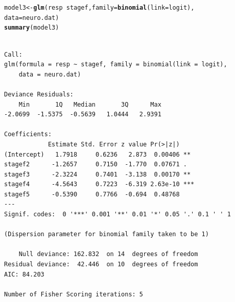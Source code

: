 \documentclass[oneside]{book}\usepackage[]{graphicx}\usepackage[svgnames]{xcolor}
\makeatletter
\newcommand{\hlopt}[1]{\textcolor[rgb]{0,0,0}{#1}}%
\newcommand{\hlstd}[1]{\textcolor[rgb]{0.345,0.345,0.345}{#1}}%
\newcommand{\hlkwb}[1]{\textcolor[rgb]{0.69,0.353,0.396}{#1}}%
\newcommand{\hlkwc}[1]{\textcolor[rgb]{0.333,0.667,0.333}{#1}}%
\newcommand{\hlkwd}[1]{\textcolor[rgb]{0.737,0.353,0.396}{\textbf{#1}}}%
\newenvironment{kframe}{%
 \def\at@end@of@kframe{}%
 \ifinner\ifhmode%
  \def\at@end@of@kframe{\end{minipage}}%
  \begin{minipage}{\columnwidth}%
 \fi\fi%
 \def\FrameCommand##1{\hskip\@totalleftmargin \hskip-\fboxsep
 \colorbox{shadecolor}{##1}\hskip-\fboxsep
     \hskip-\linewidth \hskip-\@totalleftmargin \hskip\columnwidth}%
 \MakeFramed {\advance\hsize-\width
   \@totalleftmargin\z@ \linewidth\hsize
   \@setminipage}}%
 {\par\unskip\endMakeFramed%
 \at@end@of@kframe}
\newenvironment{knitrout}{}{} %
\makeatother
\begin{document}
\begin{knitrout}
\color{fgcolor}\begin{kframe}
\begin{alltt}
\hlstd{model3} \hlkwb{<-} \hlkwd{glm}\hlstd{(resp} \hlopt{~} \hlstd{stagef,} \hlkwc{family} \hlstd{=} \hlkwd{binomial}\hlstd{(}\hlkwc{link} \hlstd{= logit),}
  \hlkwc{data} \hlstd{= neuro.dat)}
\hlkwd{summary}\hlstd{(model3)}
\end{alltt}
\begin{verbatim}

Call:
glm(formula = resp ~ stagef, family = binomial(link = logit), 
    data = neuro.dat)

Deviance Residuals: 
    Min       1Q   Median       3Q      Max  
-2.0699  -1.5375  -0.5639   1.0444   2.9391  

Coefficients:
            Estimate Std. Error z value Pr(>|z|)    
(Intercept)   1.7918     0.6236   2.873  0.00406 ** 
stagef2      -1.2657     0.7150  -1.770  0.07671 .  
stagef3      -2.3224     0.7401  -3.138  0.00170 ** 
stagef4      -4.5643     0.7223  -6.319 2.63e-10 ***
stagef5      -0.5390     0.7766  -0.694  0.48768    
---
Signif. codes:  0 '***' 0.001 '**' 0.01 '*' 0.05 '.' 0.1 ' ' 1

(Dispersion parameter for binomial family taken to be 1)

    Null deviance: 162.832  on 14  degrees of freedom
Residual deviance:  42.446  on 10  degrees of freedom
AIC: 84.203

Number of Fisher Scoring iterations: 5
\end{verbatim}
\end{kframe}
\end{knitrout}
\end{document}
